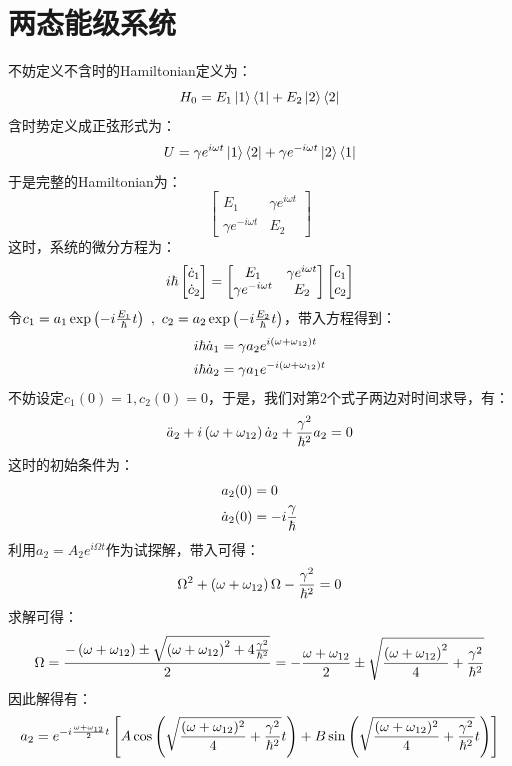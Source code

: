 \section{两态能级系统}
不妨定义不含时的Hamiltonian定义为：
\[
H_{0} = E_{1}\ket{1}\bra{1} + E_{2}\ket{2}\bra{2}
\]
含时势定义成正弦形式为：
\[
U = \gamma e^{i\omega t}\ket{1}\bra{2} + \gamma e^{-i\omega t}\ket{2}\bra{1}
\]
于是完整的Hamiltonian为：
\[
\begin{bmatrix}
E_{1} & \gamma e^{i\omega t} \\
\gamma e^{-i\omega t} & E_{2} 
\end{bmatrix}
\]
这时，系统的微分方程为：
\begin{align*}
i\hbar
\begin{bmatrix}
\dot{c}_{1} \\
\dot{c}_{2}
\end{bmatrix} 
= 
\begin{bmatrix}
E_{1} & \gamma e^{i\omega t} \\
\gamma e^{-i\omega t} & E_{2} 
\end{bmatrix}
\begin{bmatrix}
c_{1} \\
c_{2} 
\end{bmatrix}
\end{align*}
令\(c_{1} = a_{1}\exp\left({-i\frac{E_{1}}{\hbar}t}\right)\ ,\ c_{2} = a_{2}\exp\left({-i\frac{E_{2}}{\hbar}t}\right)\)，带入方程得到：
\begin{align*}
& i\hbar\dot{a}_{1} = \gamma a_{2}e^{i\left({\omega+\omega_{12}}\right)t} \\
& i\hbar\dot{a}_{2} = \gamma a_{1}e^{-i\left({\omega+\omega_{12}}\right)t}
\end{align*}
不妨设定\(c_{1}(0)=1,c_{2}(0)=0\)，于是，我们对第2个式子两边对时间求导，有：
\[
\ddot{a}_{2} + i\left({\omega+\omega_{12}}\right)\dot{a}_{2} + \frac{\gamma^{2}}{\hbar^{2}}a_{2} = 0
\]
这时的初始条件为：
\begin{align*}
& a_{2}(0) = 0 \\
& \dot{a}_{2}(0) = -i\frac{\gamma}{\hbar}
\end{align*}
利用\(a_{2} = A_{2}e^{i\Omega t}\)作为试探解，带入可得：
\[
\Omega^{2} + \left({\omega+\omega_{12}}\right)\Omega - \frac{\gamma^{2}}{\hbar^{2}} = 0
\]
求解可得：
\[
\Omega = \frac{-\left({\omega+\omega_{12}}\right) \pm \sqrt{\left({\omega+\omega_{12}}\right)^{2} + 4\frac{\gamma^{2}}{\hbar^{2}}}}{2} = -\frac{\omega+\omega_{12}}{2} \pm \sqrt{\frac{\left({\omega+\omega_{12}}\right)^{2}}{4} + \frac{\gamma^{2}}{\hbar^{2}}}
\]
因此解得有：
\[
a_{2} = e^{-i\frac{\omega+\omega_{12}}{2}t}\left[{A\cos\left({\sqrt{\frac{(\omega+\omega_{12})^{2}}{4}+\frac{\gamma^{2}}{\hbar^{2}}}t}\right) + B\sin\left({\sqrt{\frac{(\omega+\omega_{12})^{2}}{4}+\frac{\gamma^{2}}{\hbar^{2}}}t}\right)}\right]
\]
